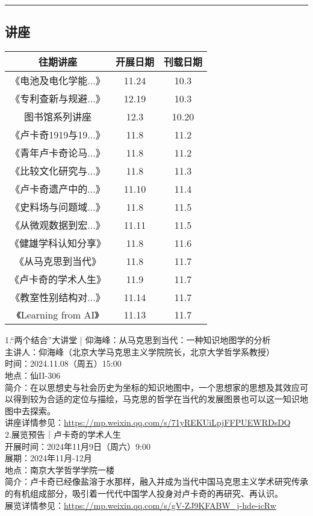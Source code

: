 \documentclass[letterpaper, 12pt]{article}
\begin{document}
\hrule
\pagebreak
\begin{multicols}{2}

\section{讲座}
\begin{tabular}{|c|c|c|}
    \hline
    往期讲座 & 开展日期 & 刊载日期\\
    \hline\hline
    《电池及电化学能...》 & 11.24 & 10.3\\
    《专利查新与规避...》 & 12.19 & 10.3\\
    图书馆系列讲座 & 12.3 & 10.20\\
    《卢卡奇1919与19...》 & 11.8 & 11.2\\
    《青年卢卡奇论马...》 & 11.8 & 11.2\\
    《比较文化研究与...》 & 11.8 & 11.3\\
    《卢卡奇遗产中的...》 & 11.10 & 11.4\\
    《史料场与问题域...》 & 11.8 & 11.5\\
    《从微观数据到宏...》& 11.11 & 11.5\\
    《健雄学科认知分享》 & 11.8 & 11.6\\
    《从马克思到当代》 & 11.8 & 11.7\\
    《卢卡奇的学术人生》 & 11.9 & 11.7\\
    《教室性别结构对...》 & 11.14 & 11.7\\
    《Learning from AI》 & 11.13 & 11.7\\
    \hline
\end{tabular}

1.“两个结合”大讲堂 | 仰海峰：从马克思到当代：一种知识地图学的分析\\
主讲人：仰海峰（北京大学马克思主义学院院长，北京大学哲学系教授）\\
时间：2024.11.08（周五）15:00\\
地点：仙II-306\\
简介：在以思想史与社会历史为坐标的知识地图中，一个思想家的思想及其效应可以得到较为合适的定位与描绘，马克思的哲学在当代的发展图景也可以这一知识地图中去探索。\\
讲座详情参见：\url{https://mp.weixin.qq.com/s/71yREKUiLpjFFPUEWRDsDQ}\\

2.展览预告｜卢卡奇的学术人生\\
开展时间：2024年11月9日（周六）9:00\\
展期：2024年11月-12月\\
地点：南京大学哲学学院一楼\\
简介：卢卡奇已经像盐溶于水那样，融入并成为当代中国马克思主义学术研究传承的有机组成部分，吸引着一代代中国学人投身对卢卡奇的再研究、再认识。\\
展览详情参见：\url{https://mp.weixin.qq.com/s/gV-ZJ9KFABW_j-hde-icRw}\\


\end{multicols}
\end{document}

